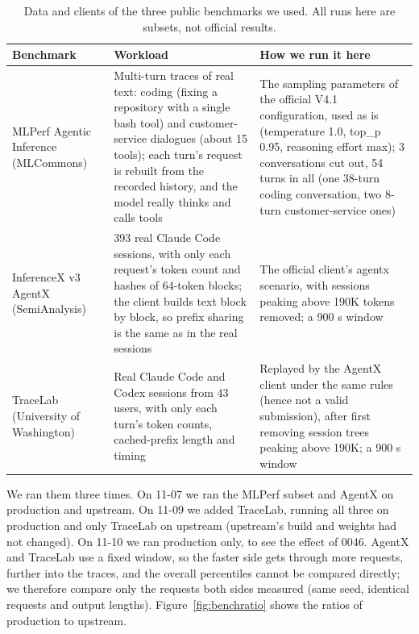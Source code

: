 \documentclass[11pt,a4paper]{article}
\begin{document}
\begin{table}[h]
  \centering
  \small
  \caption{Data and clients of the three public benchmarks we used. All runs here are subsets, not official results.}
  \label{tab:benchmarks}
  \begin{tabularx}{\textwidth}{@{}>{\raggedright\arraybackslash}p{2.6cm} X X@{}}
    \toprule
    Benchmark & Workload & How we run it here \\
    \midrule
    MLPerf Agentic Inference (MLCommons)~\cite{mlperf} & Multi-turn traces of real text: coding (fixing a repository with a single bash tool) and customer-service dialogues (about 15 tools); each turn's request is rebuilt from the recorded history, and the model really thinks and calls tools & The sampling parameters of the official V4.1 configuration, used as is (temperature 1.0, top\_p 0.95, reasoning effort max); 3 conversations cut out, 54 turns in all (one 38-turn coding conversation, two 8-turn customer-service ones) \\
    InferenceX v3 AgentX (SemiAnalysis)~\cite{agentx} & 393 real Claude Code sessions, with only each request's token count and hashes of 64-token blocks; the client builds text block by block, so prefix sharing is the same as in the real sessions & The official client's agentx scenario, with sessions peaking above 190K tokens removed; a 900 s window \\
    TraceLab (University of Washington)~\cite{tracelab} & Real Claude Code and Codex sessions from 43 users, with only each turn's token counts, cached-prefix length and timing & Replayed by the AgentX client under the same rules (hence not a valid submission), after first removing session trees peaking above 190K; a 900 s window \\
    \bottomrule
  \end{tabularx}
\end{table}

We ran them three times. On 11-07 we ran the MLPerf subset and AgentX on production and upstream. On 11-09 we added TraceLab, running all three on production and only TraceLab on upstream (upstream's build and weights had not changed). On 11-10 we ran production only, to see the effect of 0046. AgentX and TraceLab use a fixed window, so the faster side gets through more requests, further into the traces, and the overall percentiles cannot be compared directly; we therefore compare only the requests both sides measured (same seed, identical requests and output lengths). Figure~\ref{fig:benchratio} shows the ratios of production to upstream.
\end{document}
